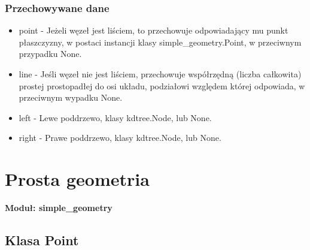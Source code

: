\documentclass{article}
\begin{document}
            \subsubsection{Przechowywane dane}
                \begin{itemize}
                    \item point - Jeżeli węzeł jest liściem, to przechowuje odpowiadający mu punkt płaszczyzny, w postaci instancji klasy simple\_geometry.Point, w przeciwnym przypadku None. 
                    \item line - Jeśli węzeł nie jest liściem, przechowuje współrzędną (liczba całkowita) prostej prostopadłej do osi układu, podziałowi względem której odpowiada, w przeciwnym wypadku None. 
                    \item left - Lewe poddrzewo, klasy kdtree.Node, lub None.
                    \item right - Prawe poddrzewo, klasy kdtree.Node, lub None.
                \end{itemize}
                
    \section{Prosta geometria}
        \textbf{Moduł: simple\_geometry}
        \subsection{Klasa Point}
\end{document}
